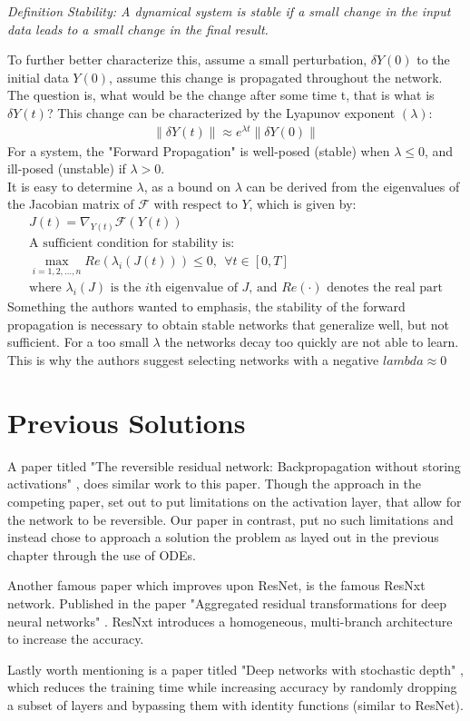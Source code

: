 \documentclass{article}
\theoremstyle{remark}
\newcommand{\norm}[1]{\left\lVert#1\right\rVert}
\begin{document}
\textit{Definition Stability: A dynamical system is stable if a small change in the input data leads to a small change in the final result.} \\
\par 
To further better characterize this, assume a small perturbation, $\delta Y(0)$ to the initial data $Y(0)$, assume this change is propagated throughout the network. The question is, 
what would be the change after some time t, that is what is $\delta Y(t)$? This change can be characterized by the Lyapunov exponent $(\lambda)$:
\begin{gather*}
    \norm{\delta Y(t)} \approx e^{\lambda t} \norm{\delta Y(0)}
\end{gather*}
For a system, the "Forward Propagation" is well-posed (stable) when $\lambda \leq 0$, and ill-posed (unstable) if $\lambda > 0$. \\
It is easy to determine $\lambda$, as a bound on $\lambda$ can be derived from the eigenvalues of the Jacobian matrix of $\mathcal{F}$ with respect to $Y$, which is given by:
\begin{gather}
    J(t) = \nabla_{Y(t)} \mathcal{F}(Y(t)) \nonumber \\
    \text{A sufficient condition for stability is: } \nonumber \\
    \boxed{\max_{i = 1,2,\dots, n} Re(\lambda_i (J(t))) \leq 0, \ \ \forall t \in [0,T]} \\
    \text{where $\lambda_i(J)$ is the $i$th eigenvalue of $J$, and $Re(\cdot)$ denotes the real part} \nonumber
\end{gather}
Something the authors wanted to emphasis, the stability of the forward propagation is necessary to obtain stable networks that generalize well, but not sufficient. For a too small $\lambda$ 
the networks decay too quickly are not able to learn. This is why the authors suggest selecting networks with a negative $lambda \approx 0$

\section*{Previous Solutions}
    A paper titled "The reversible residual network: Backpropagation without storing activations" \cite{Gomez}, does similar work to this paper. Though the approach in the competing paper, set 
out to put limitations on the activation layer, that allow for the network to be reversible. Our paper in contrast, put no such limitations and instead chose to approach a solution the problem 
as layed out in the previous chapter through the use of ODEs. \par 
    Another famous paper which improves upon ResNet, is the famous ResNxt network. Published in the paper "Aggregated residual transformations for deep neural networks" \cite{ResNxt}. 
ResNxt introduces a homogeneous, multi-branch architecture to increase the accuracy. \par 
    Lastly worth mentioning is a paper titled "Deep networks with stochastic depth" \cite{stochastic depth}, which reduces the training time while increasing accuracy by randomly dropping a 
subset of layers and bypassing them with identity functions (similar to ResNet).
\end{document}
